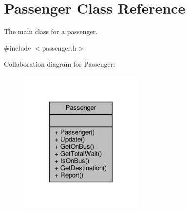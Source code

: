 \hypertarget{classPassenger}{}\section{Passenger Class Reference}
\label{classPassenger}


The main class for a passenger.  




{\ttfamily \#include $<$passenger.\+h$>$}



Collaboration diagram for Passenger\+:\nopagebreak
\begin{figure}[H]
\begin{center}
\leavevmode
\includegraphics[width=177pt]{classPassenger__coll__graph}
\end{center}
\end{figure}

